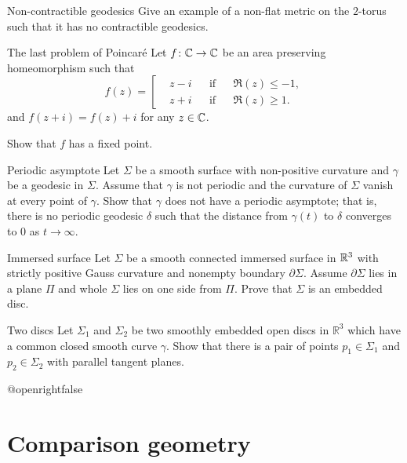 \documentclass[twoside]{book}
\begin{document}
\begin{pr}{\easy}{Non-contractible geodesics}\label{torus}
Give an example of a non-flat metric 
on the $2$-torus such that it has no contractible geodesics.
\end{pr}

\begin{pr}{\hard}{The last problem of Poincar\'e}\label{The last problem of Poincare}
Let $f\colon\mathbb{C}\to \mathbb{C}$ be an area preserving homeomorphism
such that 
\[f(z)
=
\left[
\begin{aligned}
&z-i&&\text{if}&&\Re(z)\le -1,
\\
&z+i&&\text{if}&&\Re(z)\ge 1.
\end{aligned}
\right.
\] 
and $f(z+i)=f(z)+i$ for any $z\in\mathbb{C}$.

Show that $f$ has a fixed point.
\end{pr}


\begin{pr}{}{Periodic asymptote}\label{Asymptotic geodesic}
Let $\Sigma$ be a smooth surface with non-positive curvature
and $\gamma$ be a geodesic in $\Sigma$.
Assume that $\gamma$ is not periodic
and the curvature of $\Sigma$ vanish at every point of $\gamma$.
Show that $\gamma$ does not have a periodic asymptote;
that is, there is no periodic geodesic $\delta$ such that the distance from $\gamma(t)$ to $\delta$  converges to $0$ as $t\to\infty$. 
\end{pr}

\begin{pr}{}{Immersed surface}\label{Immersed surface}
Let $\Sigma$ be a smooth connected immersed surface in $\mathbb{R}^3$ with strictly positive Gauss curvature and nonempty boundary $\partial\Sigma$.
Assume $\partial\Sigma$ lies in a plane $\Pi$
and whole $\Sigma$ lies on one side from $\Pi$.
Prove that $\Sigma$ is an embedded disc.
\end{pr}

\begin{pr}{}{Two discs}\label{Two discs}
Let $\Sigma_1$ and $\Sigma_2$ be two smoothly embedded open discs in $\mathbb R^3$ 
which have a common closed smooth curve $\gamma$.
Show that there is a pair of points  $p_1\in \Sigma_1$ and $p_2\in \Sigma_2$ with parallel tangent planes.
\end{pr}



\csname @openrightfalse\endcsname
\chapter{Comparison geometry}
\end{document}
